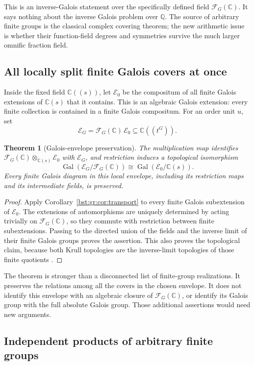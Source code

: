 \documentclass[11pt,letterpaper]{article}
\newtheorem{theorem}{Theorem}[section]
\theoremstyle{definition}
\theoremstyle{remark}
\newcommand{\Q}{\mathbb Q}
\newcommand{\C}{\mathbb C}
\newcommand{\HH}[2]{#1((t^{#2}))}
\newcommand{\FF}[2]{\mathcal F_{#2}(#1)}
\newcommand{\Gal}{\operatorname{Gal}}
\begin{document}
This is an inverse-Galois statement over the specifically defined field
$\FF{\C}G$. It says nothing about the inverse Galois problem over $\Q$. The
source of arbitrary finite groups is the classical complex covering theorem;
the new arithmetic issue is whether their function-field degrees and
symmetries survive the much larger omnific fraction field.

\subsection{All locally split finite Galois covers at once}

Inside the fixed field $\C((s))$, let $\mathcal E_0$ be the compositum of all
finite Galois extensions of $\C(s)$ that it contains. This is an algebraic
Galois extension: every finite collection is contained in a finite Galois
compositum. For an order unit $u$, set
\[
 \mathcal E_G=\FF{\C}G\,\mathcal E_0\subseteq\HH{\C}G.
\]

\begin{theorem}[Galois-envelope preservation]\label{bst:gr:thm:envelope}
The multiplication map identifies $\FF{\C}G\otimes_{\C(s)}\mathcal E_0$ with
$\mathcal E_G$, and restriction induces a topological isomorphism
\[
 \Gal(\mathcal E_G/\FF{\C}G)\cong\Gal(\mathcal E_0/\C(s)).
\]
Every finite Galois diagram in this local envelope, including its
restriction maps and its intermediate fields, is preserved.
\end{theorem}
\begin{proof}
Apply Corollary~\ref{bst:gr:cor:transport} to every finite Galois
subextension of $\mathcal E_0$. The extensions of automorphisms are uniquely
determined by acting trivially on $\FF{\C}G$, so they commute with
restriction between finite subextensions. Passing to the directed union of
the fields and the inverse limit of their finite Galois groups proves the
assertion. This also proves the topological claim, because both Krull
topologies are the inverse-limit topologies of those finite quotients
\cite[Chapter~7]{MilneFT}.
\end{proof}

The theorem is stronger than a disconnected list of finite-group
realizations. It preserves the relations among all the covers in the
chosen envelope. It does not identify this envelope with an algebraic
closure of $\FF{\C}G$, or identify its Galois group with the full absolute
Galois group. Those additional assertions would need new arguments.

\subsection{Independent products of arbitrary finite groups}
\end{document}
